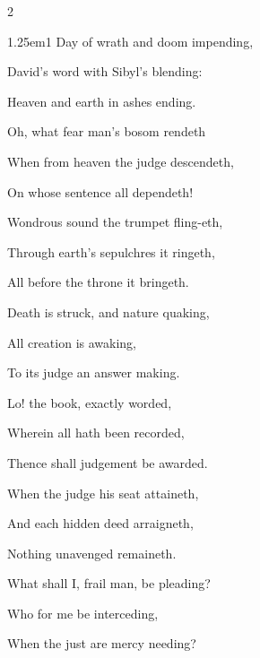 \begin{multicols}{2}
\begin{hangparas}{1.25em}{1}
Day of wrath and doom impending,\par
David's word with Sibyl's blending:\par
Heaven and earth in ashes ending.\par
\vspace{0.5\baselineskip}
\par\noindent
Oh, what fear man's bosom rendeth\par\noindent
When from heaven the judge descendeth,\par\noindent
On whose sentence all dependeth!\par
\vspace{0.5\baselineskip}
\par\noindent
Wondrous sound the trumpet fling-eth,\par\noindent
Through earth's sepulchres it ringeth,\par\noindent
All before the throne it bringeth.\par
\vspace{0.5\baselineskip}
\par\noindent
Death is struck, and nature quaking,\par\noindent
All creation is awaking,\par\noindent
To its judge an answer making.\par
\vspace{0.5\baselineskip}
\par\noindent
Lo! the book, exactly worded,\par\noindent
Wherein all hath been recorded,\par\noindent
Thence shall judgement be awarded.\par
\vspace{0.5\baselineskip}
\par\noindent
When the judge his seat attaineth,\par\noindent
And each hidden deed arraigneth,\par\noindent
Nothing unavenged remaineth.\par
\vspace{0.5\baselineskip}
\par\noindent
What shall I, frail man, be pleading?\par\noindent
Who for me be interceding,\par\noindent
When the just are mercy needing?\par
\vspace{0.5\baselineskip}

\end{hangparas}
\end{multicols}
